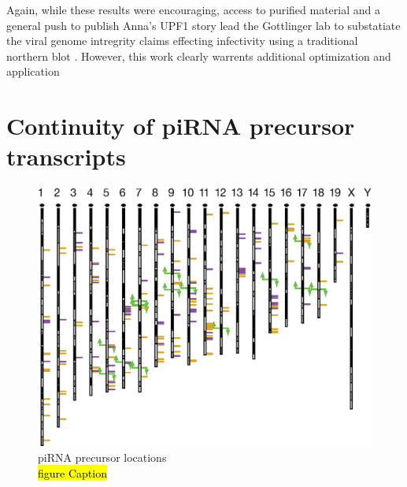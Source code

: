 Again, while these results were encouraging, access to purified material and a general push to publish Anna's UPF1 story lead the Gottlinger lab to substatiate the viral genome intregrity claims effecting infectivity using a traditional northern blot \citep{Serquina2013a}. However, this work clearly warrents additional optimization and application

\section{Continuity of piRNA precursor transcripts}\label{sec: precursor TX}


  \begin{figure}[htbp] %
    \centering 
    \includegraphics{Figures/Chapter2/PrecursorLocations.eps}
    \caption[piRNA precursor locations]
    {
      piRNA precursor locations\\
      \hl{figure Caption}
   	 }
    \label{fig:Hiv tx via SeqZip}
 	 \end{figure}


